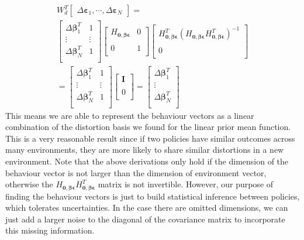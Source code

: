 \documentclass[journal]{IEEEtran}
\begin{document}
\begin{equation}
\begin{gathered}
W_{d}^T
\begin{bmatrix}
\Delta \bm{\varepsilon}_1, \cdots , \Delta \bm{\varepsilon}_N
\end{bmatrix}
= \\
\begin{bmatrix}
\Delta \bm{\beta}_1^T & 1\\
\vdots & \vdots \\
\Delta \bm{\beta}_N^T & 1\\
\end{bmatrix}
%
\begin{bmatrix}
H_{\bm{0, \beta \epsilon}} & 0 \\
\\
0 & 1 \\
\end{bmatrix}
\begin{bmatrix}
H_{\bm{0, \beta \epsilon}}^T
(H_{\bm{0, \beta \epsilon}}H_{\bm{0, \beta \epsilon}}^T)^{-1} \\
\\
0 \\
\end{bmatrix}
\\ 
= 
\begin{bmatrix}
\Delta \bm{\beta}_1^T & 1\\
\vdots & \vdots \\
\Delta \bm{\beta}_N^T & 1\\
\end{bmatrix}
%
\begin{bmatrix}
\mathbf{I} \\
\\
0 \\
\end{bmatrix} 
= 
\begin{bmatrix}
\Delta \bm{\beta}_1^T \\
\vdots \\
\Delta \bm{\beta}_N^T \\
\end{bmatrix}
\end{gathered}
\label{beta}
\end{equation}
This means we are able to represent the behaviour vectors as a linear combination of the distortion basis we found for the linear prior mean function.
This is a very reasonable result since if two policies have similar outcomes across many environments, they are more likely to share similar distortions in a new environment.
Note that the above derivations only hold if the dimension of the behaviour vector is not larger than the dimension of environment vector, otherwise the $H_{\bm{0, \beta \epsilon}}H_{\bm{0, \beta \epsilon}}^T$ matrix is not invertible.
However, our purpose of finding the behaviour vectors is just to build statistical inference between policies, which tolerates uncertainties.
In the case there are omitted dimensions, we can just add a larger noise to the diagonal of the covariance matrix to incorporate this missing information.
\end{document}
